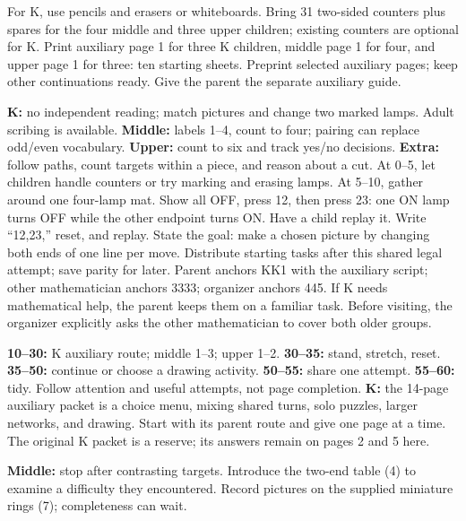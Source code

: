 \documentclass[12pt]{extarticle}
\begin{document}
For K, use pencils and erasers or whiteboards. Bring 31 two-sided counters plus spares for the four middle and three upper children; existing counters are optional for K. Print auxiliary page 1 for three K children, middle page 1 for four, and upper page 1 for three: ten starting sheets. Preprint selected auxiliary pages; keep other continuations ready. Give the parent the separate auxiliary guide.\par
\textbf{K:} no independent reading; match pictures and change two marked lamps. Adult scribing is available. \textbf{Middle:} labels 1--4, count to four; pairing can replace odd/even vocabulary. \textbf{Upper:} count to six and track yes/no decisions. \textbf{Extra:} follow paths, count targets within a piece, and reason about a cut.
At 0--5, let children handle counters or try marking and erasing lamps. At 5--10, gather around one four-lamp mat. Show all OFF, press 12, then press 23: one ON lamp turns OFF while the other endpoint turns ON. Have a child replay it. Write ``12,23,'' reset, and replay. State the goal: make a chosen picture by changing both ends of one line per move. Distribute starting tasks after this shared legal attempt; save parity for later.
Parent anchors KK1 with the auxiliary script; other mathematician anchors 3333; organizer anchors 445. If K needs mathematical help, the parent keeps them on a familiar task. Before visiting, the organizer explicitly asks the other mathematician to cover both older groups.\par
\textbf{10--30:} K auxiliary route; middle 1--3; upper 1--2. \textbf{30--35:} stand, stretch, reset. \textbf{35--50:} continue or choose a drawing activity. \textbf{50--55:} share one attempt. \textbf{55--60:} tidy. Follow attention and useful attempts, not page completion.
\textbf{K:} the 14-page auxiliary packet is a choice menu, mixing shared turns, solo puzzles, larger networks, and drawing. Start with its parent route and give one page at a time. The original K packet is a reserve; its answers remain on pages 2 and 5 here.\par
\textbf{Middle:} stop after contrasting targets. Introduce the two-end table (4) to examine a difficulty they encountered. Record pictures on the supplied miniature rings (7); completeness can wait.\par
\end{document}
